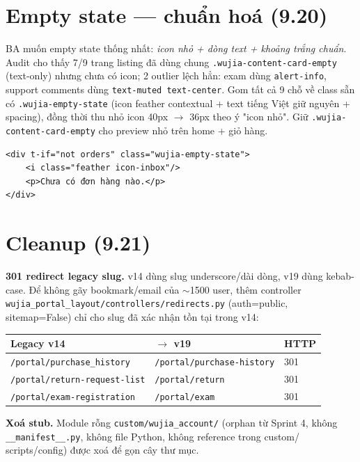 \section{Empty state --- chuẩn hoá (9.20)}

BA muốn empty state thống nhất: \emph{icon nhỏ + dòng text + khoảng trắng chuẩn}.
Audit cho thấy 7/9 trang listing đã dùng chung \texttt{.wujia-content-card-empty}
(text-only) nhưng chưa có icon; 2 outlier lệch hẳn: exam dùng \texttt{alert-info},
support comments dùng \texttt{text-muted text-center}. Gom tất cả 9 chỗ về class
sẵn có \texttt{.wujia-empty-state} (icon feather contextual + text tiếng Việt giữ
nguyên + spacing), đồng thời thu nhỏ icon 40px \(\rightarrow\) 36px theo ý "icon
nhỏ". Giữ \texttt{.wujia-content-card-empty} cho preview nhỏ trên home + giỏ hàng.

\begin{lstlisting}[style=xml]
<div t-if="not orders" class="wujia-empty-state">
    <i class="feather icon-inbox"/>
    <p>Chưa có đơn hàng nào.</p>
</div>
\end{lstlisting}

\section{Cleanup (9.21)}

\textbf{301 redirect legacy slug.} v14 dùng slug underscore/dài dòng, v19 dùng
kebab-case. Để không gãy bookmark/email của \(\sim\)1500 user, thêm controller
\texttt{wujia\_portal\_layout/controllers/redirects.py} (auth=public, sitemap=False)
chỉ cho slug đã xác nhận tồn tại trong v14:

\begin{longtable}{@{}lll@{}}
\toprule
\textbf{Legacy v14} & \textbf{$\rightarrow$ v19} & \textbf{HTTP} \\
\midrule
\endhead
\texttt{/portal/purchase\_history} & \texttt{/portal/purchase-history} & 301 \\
\texttt{/portal/return-request-list} & \texttt{/portal/return} & 301 \\
\texttt{/portal/exam-registration} & \texttt{/portal/exam} & 301 \\
\bottomrule
\end{longtable}

\textbf{Xoá stub.} Module rỗng \texttt{custom/wujia\_account/} (orphan từ Sprint 4,
không \texttt{\_\_manifest\_\_.py}, không file Python, không reference trong custom/
scripts/config) được xoá để gọn cây thư mục.

